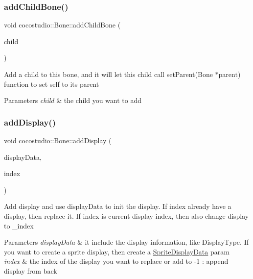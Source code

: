 \subsubsection{\texorpdfstring{add\+Child\+Bone()}{addChildBone()}\hspace{0.1cm}{\footnotesize\ttfamily [2/2]}}
{\footnotesize\ttfamily void cocostudio\+::\+Bone\+::add\+Child\+Bone (\begin{DoxyParamCaption}\item[{\hyperlink{classcocostudio_1_1Bone}{Bone} $\ast$}]{child }\end{DoxyParamCaption})}

Add a child to this bone, and it will let this child call set\+Parent(\+Bone $\ast$parent) function to set self to it\textquotesingle{}s parent 
\begin{DoxyParams}{Parameters}
{\em child} & the child you want to add \\
\hline
\end{DoxyParams}
\mbox{\label{classcocostudio_1_1Bone_a9400051f055db9419231d6fb516bcd78}} 
\subsubsection{\texorpdfstring{add\+Display()}{addDisplay()}\hspace{0.1cm}{\footnotesize\ttfamily [1/2]}}
{\footnotesize\ttfamily void cocostudio\+::\+Bone\+::add\+Display (\begin{DoxyParamCaption}\item[{\hyperlink{classcocostudio_1_1DisplayData}{Display\+Data} $\ast$}]{display\+Data,  }\item[{int}]{index }\end{DoxyParamCaption})}

Add display and use display\+Data to init the display. If index already have a display, then replace it. If index is current display index, then also change display to \+\_\+index


\begin{DoxyParams}{Parameters}
{\em display\+Data} & it include the display information, like Display\+Type. If you want to create a sprite display, then create a \hyperlink{classcocostudio_1_1SpriteDisplayData}{Sprite\+Display\+Data} param\\
\hline
{\em index} & the index of the display you want to replace or add to -\/1 \+: append display from back \\
\hline
\end{DoxyParams}
\mbox{\label{classcocostudio_1_1Bone_a9400051f055db9419231d6fb516bcd78}} 

